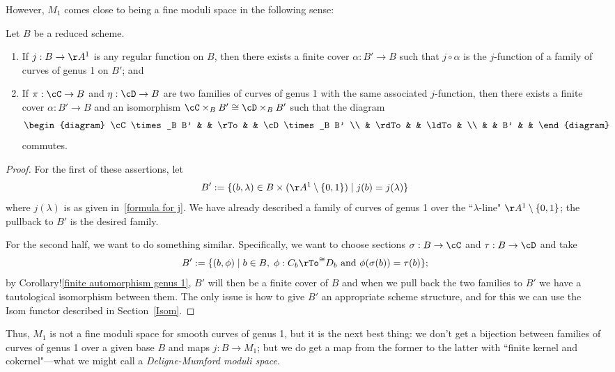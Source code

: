 However, $M_1$ comes close to being a fine moduli space in the following sense:

\begin{proposition}\label{families on pullbacks} Let $B$ be a reduced scheme.
\begin{enumerate}
\item If $j : B \to \AA^1$ is any regular function on $B$, then there exists a finite cover $\alpha : B' \to B$ such that $j \circ \alpha$ is the $j$-function of a family of curves of genus 1 on $B'$; and
\item If $\pi : \cC \to B$ and $\eta : \cD \to B$ are two families of curves of genus 1 with the same associated $j$-function, then there exists a finite cover $\alpha : B' \to B$ and an isomorphism $\cC \times_B B' \cong \cD \times_B B'$ such that the diagram
$$
\begin{diagram}
\cC \times_B B' & & \rTo & & \cD \times_B B' \\
& \rdTo & & \ldTo & \\
& & B' & &
\end{diagram} 
$$
commutes.
\end{enumerate}
\end{proposition}

\begin{proof} For the first of these assertions, let
$$
B' := \{(b, \lambda) \in B \times (\AA^1 \setminus \{0,1\}) \mid j(b) = j(\lambda)\}
$$
where $j(\lambda)$ is as given in~\ref{formula for j}. We have already described a family of curves of genus 1 over the ``$\lambda$-line" $\AA^1 \setminus \{0,1\}$; the pullback to $B'$ is the desired family.

For the second half, we want to do something similar. Specifically, we want to choose sections $\sigma : B \to \cC$ and $\tau: B \to \cD$ and take
$$
B' := \{ (b, \phi) \mid b \in B, \; \phi : C_b \rTo^{\cong} D_b  \text{ and } \phi(\sigma(b)) = \tau(b) \};
$$
by Corollary!\ref{finite automorphism genus 1}, $B'$ will then be a finite cover of $B$ and when we pull back the two families to $B'$ we have a tautological isomorphism between them. The only issue is how to give $B'$ an appropriate scheme structure, and for this we can use the Isom functor described in Section~\ref{Isom}.
\end{proof}

Thus, $M_1$ is not a fine moduli space for smooth curves of genus 1, but it is the next best thing: we don't get a bijection between families of curves of genus 1 over a given base $B$ and maps $j : B \to M_1$; but we do get a map from the former to the latter with ``finite kernel and cokernel"---what we might call a \emph{Deligne-Mumford moduli space}.

